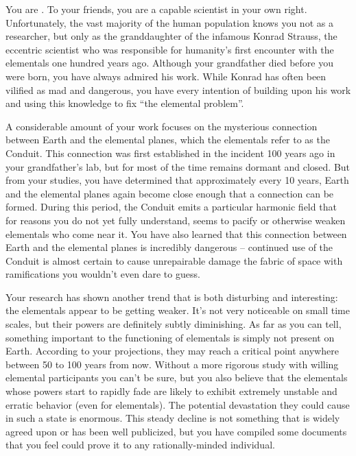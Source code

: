 \documentclass[char]{guildcamp1}
\begin{document}
\name{\cGD{}}

You are \cGD{\intro}. To your friends, you are a capable scientist in your own right. Unfortunately, the vast majority of the human population knows you not as a researcher, but only as the granddaughter of the infamous Konrad Strauss, the eccentric scientist who was responsible for humanity's first encounter with the elementals one hundred years ago. Although your grandfather died before you were born, you have always admired his work. While Konrad has often been vilified as mad and dangerous, you have every intention of building upon his work and using this knowledge to fix ``the elemental problem''.

A considerable amount of your work focuses on the mysterious connection between Earth and the elemental planes, which the elementals refer to as the Conduit. This connection was first established in the incident 100 years ago in your grandfather's lab, but for most of the time remains dormant and closed. But from your studies, you have determined that approximately every 10 years, Earth and the elemental planes again become close enough that a connection can be formed. During this period, the Conduit emits a particular harmonic field that for reasons you do not yet fully understand, seems to pacify or otherwise weaken elementals who come near it. You have also learned that this connection between Earth and the elemental planes is incredibly dangerous -- continued use of the Conduit is almost certain to cause unrepairable damage the fabric of space with ramifications you wouldn't even dare to guess.

Your research has shown another trend that is both disturbing and interesting: the elementals appear to be getting weaker. It's not very noticeable on small time scales, but their powers are definitely subtly diminishing. As far as you can tell, something important to the functioning of elementals is simply not present on Earth. According to your projections, they may reach a critical point anywhere between 50 to 100 years from now. Without a more rigorous study with willing elemental participants you can't be sure, but you also believe that the elementals whose powers start to rapidly fade are likely to exhibit extremely unstable and erratic behavior (even for elementals). The potential devastation they could cause in such a state is enormous. This steady decline is not something that is widely agreed upon or has been well publicized, but you have compiled some documents that you feel could prove it to any rationally-minded individual.
\end{document}
